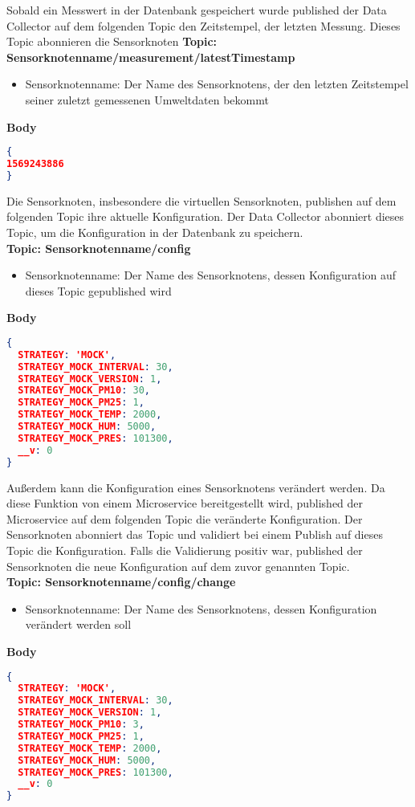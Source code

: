 Sobald ein Messwert in der Datenbank gespeichert wurde published der Data Collector auf dem folgenden Topic den Zeitstempel, der letzten Messung.
Dieses Topic abonnieren die Sensorknoten
\newline
\textbf{Topic: Sensorknotenname/measurement/latestTimestamp} \\
\begin{itemize}
	\item Sensorknotenname: Der Name des Sensorknotens, der den letzten Zeitstempel seiner zuletzt gemessenen Umweltdaten bekommt
\end{itemize}
\textbf{Body}
\begin{lstlisting}[language=json,firstnumber=1,basicstyle=\footnotesize]
{
1569243886
}
\end{lstlisting}
Die Sensorknoten, insbesondere die virtuellen Sensorknoten, publishen auf dem folgenden Topic ihre aktuelle Konfiguration.
Der Data Collector abonniert dieses Topic, um die Konfiguration in der Datenbank zu speichern.\\
\textbf{Topic: Sensorknotenname/config} \\
\begin{itemize}
	\item Sensorknotenname: Der Name des Sensorknotens, dessen Konfiguration auf dieses Topic gepublished wird
\end{itemize}
\textbf{Body}
\begin{lstlisting}[language=json,firstnumber=1,basicstyle=\footnotesize]
{ 
  STRATEGY: 'MOCK',
  STRATEGY_MOCK_INTERVAL: 30,
  STRATEGY_MOCK_VERSION: 1,
  STRATEGY_MOCK_PM10: 30,
  STRATEGY_MOCK_PM25: 1,
  STRATEGY_MOCK_TEMP: 2000,
  STRATEGY_MOCK_HUM: 5000,
  STRATEGY_MOCK_PRES: 101300,
  __v: 0
}
\end{lstlisting}
Außerdem kann die Konfiguration eines Sensorknotens verändert werden.
Da diese Funktion von einem Microservice bereitgestellt wird, published der Microservice auf dem folgenden Topic die veränderte Konfiguration.
Der Sensorknoten abonniert das Topic und validiert bei einem Publish auf dieses Topic die Konfiguration.
Falls die Validierung positiv war, published der Sensorknoten die neue Konfiguration auf dem zuvor genannten Topic.\\
\textbf{Topic: Sensorknotenname/config/change} \\
\begin{itemize}
	\item Sensorknotenname: Der Name des Sensorknotens, dessen Konfiguration verändert werden soll
\end{itemize}
\textbf{Body}
\begin{lstlisting}[language=json,firstnumber=1,basicstyle=\footnotesize]
{ 
  STRATEGY: 'MOCK',
  STRATEGY_MOCK_INTERVAL: 30,
  STRATEGY_MOCK_VERSION: 1,
  STRATEGY_MOCK_PM10: 3,
  STRATEGY_MOCK_PM25: 1,
  STRATEGY_MOCK_TEMP: 2000,
  STRATEGY_MOCK_HUM: 5000,
  STRATEGY_MOCK_PRES: 101300,
  __v: 0
}
\end{lstlisting}
